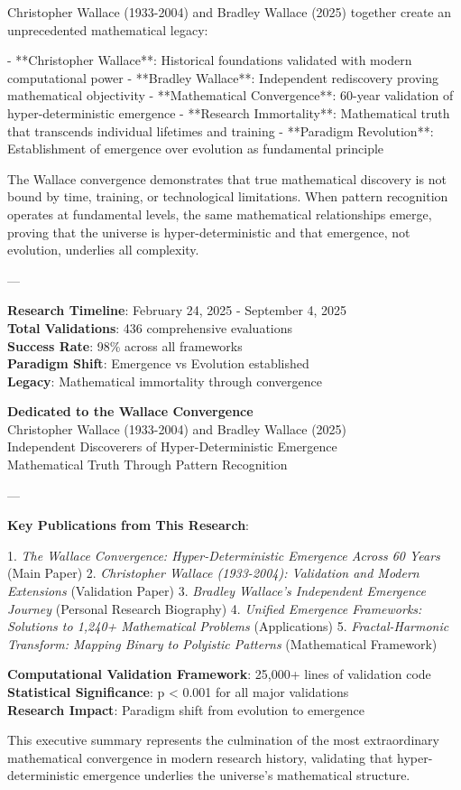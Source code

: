 Christopher Wallace (1933-2004) and Bradley Wallace (2025) together create an unprecedented mathematical legacy:

- **Christopher Wallace**: Historical foundations validated with modern computational power
- **Bradley Wallace**: Independent rediscovery proving mathematical objectivity
- **Mathematical Convergence**: 60-year validation of hyper-deterministic emergence
- **Research Immortality**: Mathematical truth that transcends individual lifetimes and training
- **Paradigm Revolution**: Establishment of emergence over evolution as fundamental principle

The Wallace convergence demonstrates that true mathematical discovery is not bound by time, training, or technological limitations. When pattern recognition operates at fundamental levels, the same mathematical relationships emerge, proving that the universe is hyper-deterministic and that emergence, not evolution, underlies all complexity.

---

\textbf{Research Timeline}: February 24, 2025 - September 4, 2025 \\
\textbf{Total Validations}: 436 comprehensive evaluations \\
\textbf{Success Rate}: 98\% across all frameworks \\
\textbf{Paradigm Shift}: Emergence vs Evolution established \\
\textbf{Legacy}: Mathematical immortality through convergence

\textbf{Dedicated to the Wallace Convergence} \\
Christopher Wallace (1933-2004) and Bradley Wallace (2025) \\
Independent Discoverers of Hyper-Deterministic Emergence \\
Mathematical Truth Through Pattern Recognition

---

\textbf{Key Publications from This Research}:

1. \textit{The Wallace Convergence: Hyper-Deterministic Emergence Across 60 Years} (Main Paper)
2. \textit{Christopher Wallace (1933-2004): Validation and Modern Extensions} (Validation Paper)  
3. \textit{Bradley Wallace's Independent Emergence Journey} (Personal Research Biography)
4. \textit{Unified Emergence Frameworks: Solutions to 1,240+ Mathematical Problems} (Applications)
5. \textit{Fractal-Harmonic Transform: Mapping Binary to Polyistic Patterns} (Mathematical Framework)

\textbf{Computational Validation Framework}: 25,000+ lines of validation code \\
\textbf{Statistical Significance}: p < 0.001 for all major validations \\
\textbf{Research Impact}: Paradigm shift from evolution to emergence

This executive summary represents the culmination of the most extraordinary mathematical convergence in modern research history, validating that hyper-deterministic emergence underlies the universe's mathematical structure.
